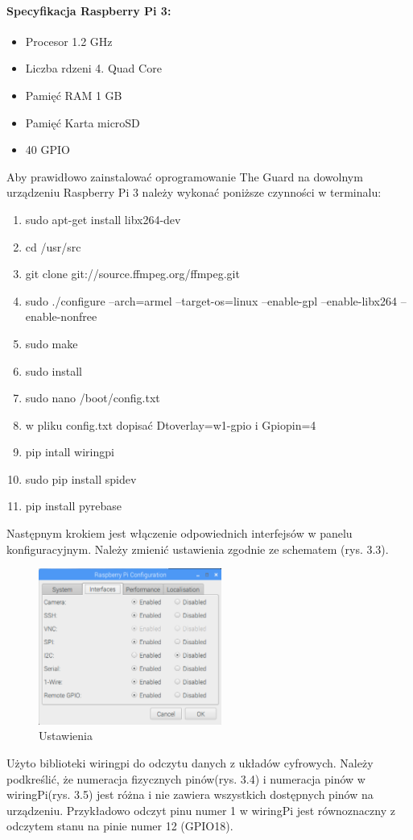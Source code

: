 \paragraph{Specyfikacja Raspberry Pi 3:}
\begin{itemize} 
\item Procesor 1.2 GHz
\item Liczba rdzeni 4. Quad Core
\item Pamięć RAM 1 GB
\item Pamięć Karta microSD
\item 40 GPIO
\end{itemize}
Aby prawidłowo zainstalować oprogramowanie The Guard na dowolnym urządzeniu Raspberry Pi 3 należy wykonać poniższe czynności w terminalu:
\begin{enumerate} 
\item sudo apt-get install libx264-dev
\item cd /usr/src
\item git clone git://source.ffmpeg.org/ffmpeg.git
\item sudo ./configure --arch=armel --target-os=linux --enable-gpl --enable-libx264 --enable-nonfree
\item sudo make
\item sudo install
\item sudo nano /boot/config.txt
\item w pliku config.txt dopisać Dtoverlay=w1-gpio i Gpiopin=4
\item pip intall wiringpi
\item sudo pip install spidev
\item pip install pyrebase
\end{enumerate}
Następnym krokiem jest włączenie odpowiednich interfejsów w panelu konfiguracyjnym. Należy zmienić ustawienia zgodnie ze schematem (rys. 3.3).
\begin{figure}[ht]
	\centering
	\includegraphics[width=6cm]{RSettings}
	\caption{Ustawienia}
\end{figure}
Użyto biblioteki wiringpi do odczytu danych z układów cyfrowych. Należy podkreślić, że numeracja fizycznych pinów(rys. 3.4) i numeracja pinów w wiringPi(rys. 3.5) jest różna i nie zawiera wszystkich dostępnych pinów na urządzeniu. Przykładowo odczyt pinu numer 1 w wiringPi jest równoznaczny z odczytem stanu na pinie numer 12 (GPIO18).
